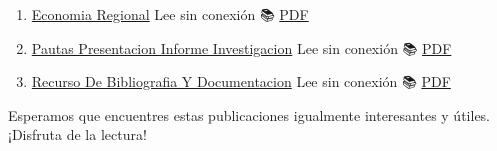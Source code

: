 \documentclass[
  jou,
  floatsintext,
  longtable,
  a4paper,
  nolmodern,
  notxfonts,
  notimes,
  colorlinks=true,linkcolor=blue,citecolor=blue,urlcolor=blue]{apa7}
\begin{document}
\begin{enumerate}
\item
  \href{https://achalmaedison.netlify.app/blog/posts/2023-05-16-economia-regional}{Economia
  Regional} Lee sin conexión 📚
  \href{https://achalmaedison.netlify.app/blog/posts/2023-05-16-economia-regional/index.pdf}{PDF}
\item
  \href{https://achalmaedison.netlify.app/blog/posts/2023-06-03-pautas-presentacion-informe-investigacion}{Pautas
  Presentacion Informe Investigacion} Lee sin conexión 📚
  \href{https://achalmaedison.netlify.app/blog/posts/2023-06-03-pautas-presentacion-informe-investigacion/index.pdf}{PDF}
\item
  \href{https://achalmaedison.netlify.app/blog/posts/2025-01-12-recurso-de-bibliografia-y-documentacion}{Recurso
  De Bibliografia Y Documentacion} Lee sin conexión 📚
  \href{https://achalmaedison.netlify.app/blog/posts/2025-01-12-recurso-de-bibliografia-y-documentacion/index.pdf}{PDF}
\end{enumerate}

Esperamos que encuentres estas publicaciones igualmente interesantes y
útiles. ¡Disfruta de la lectura!
\end{document}
